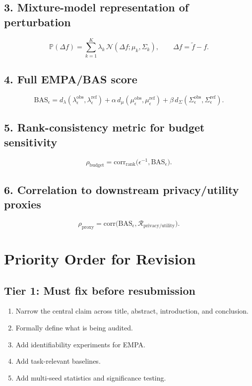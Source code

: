 \subsection*{3. Mixture-model representation of perturbation}
\begin{equation}
\mathbb{P}(\Delta f)
=
\sum_{k=1}^{K}
\lambda_k \,
\mathcal{N}(\Delta f; \mu_k, \Sigma_k),
\qquad
\Delta f = \tilde{f} - f.
\end{equation}

\subsection*{4. Full EMPA/BAS score}
\begin{equation}
\mathrm{BAS}_{\epsilon}
=
d_{\lambda}\!\left(
\lambda^{\mathrm{obs}}_{\epsilon},
\lambda^{\mathrm{ref}}_{\epsilon}
\right)
+
\alpha \,
d_{\mu}\!\left(
\mu^{\mathrm{obs}}_{\epsilon},
\mu^{\mathrm{ref}}_{\epsilon}
\right)
+
\beta \,
d_{\Sigma}\!\left(
\Sigma^{\mathrm{obs}}_{\epsilon},
\Sigma^{\mathrm{ref}}_{\epsilon}
\right).
\end{equation}

\subsection*{5. Rank-consistency metric for budget sensitivity}
\begin{equation}
\rho_{\mathrm{budget}}
=
\mathrm{corr}_{\mathrm{rank}}
\bigl(
\epsilon^{-1},
\mathrm{BAS}_{\epsilon}
\bigr).
\end{equation}

\subsection*{6. Correlation to downstream privacy/utility proxies}
\begin{equation}
\rho_{\mathrm{proxy}}
=
\mathrm{corr}
\bigl(
\mathrm{BAS}_{\epsilon},
\mathcal{R}_{\mathrm{privacy/utility}}
\bigr).
\end{equation}

\section{Priority Order for Revision}

\subsection*{Tier 1: Must fix before resubmission}
\begin{enumerate}
    \item Narrow the central claim across title, abstract, introduction, and conclusion.
    \item Formally define what is being audited.
    \item Add identifiability experiments for EMPA.
    \item Add task-relevant baselines.
    \item Add multi-seed statistics and significance testing.
\end{enumerate}

